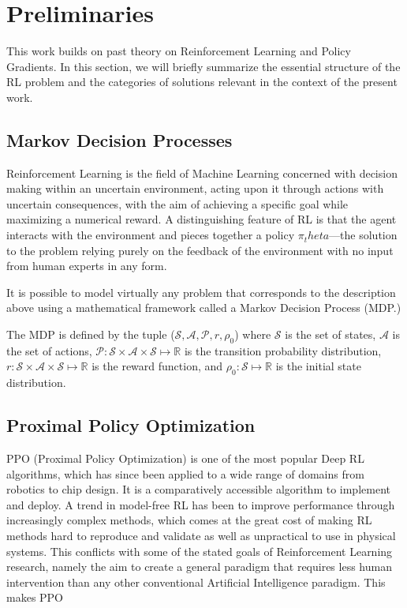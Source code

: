 \section{Preliminaries}
\label{sec:prelim}
This work builds on past theory on Reinforcement Learning and Policy Gradients. In this section, we will briefly summarize the essential structure of the RL problem and the categories of solutions relevant in the context of the present work.

\subsection{Markov Decision Processes}

Reinforcement Learning is the field of Machine Learning concerned with decision making within an uncertain environment, acting upon it through actions with uncertain consequences, with the aim of achieving a specific goal while maximizing a numerical reward. A distinguishing feature of RL is that the agent interacts with the environment and pieces together a policy $\pi_theta$––the solution to the problem relying purely on the feedback of the environment with no input from human experts in any form. 

It is possible to model virtually any problem that corresponds to the description above using a mathematical framework called a Markov Decision Process (MDP.) 

The MDP is defined by the tuple ($\mathcal{S}, \mathcal{A}, \mathcal{P}, r, \rho_0$) where $\mathcal{S}$ is the set of states, $\mathcal{A}$ is the set of actions, $\mathcal{P}: \mathcal{S}\times\mathcal{A}\times\mathcal{S}\mapsto \mathbb{R}$ is the transition probability distribution, $r: \mathcal{S}\times\mathcal{A}\times\mathcal{S} \mapsto \mathbb{R}$ is the reward function, and $\rho_0:\mathcal{S}\mapsto\mathbb{R}$ is the initial state distribution.


\subsection{Proximal Policy Optimization}

PPO (Proximal Policy Optimization\cite{schulman2017proximal}) is one of the most popular Deep RL algorithms, which has since been applied to a wide range of domains from robotics\cite{andrychowicz2020learning} to chip design\cite{mirhoseini2021graph}. It is a comparatively accessible algorithm to implement and deploy. A trend in model-free RL has been to improve performance through increasingly complex methods, which comes at the great cost of making RL methods hard to reproduce and validate as well as unpractical to use in physical systems. This conflicts with some of the stated goals of Reinforcement Learning research, namely the aim to create a general paradigm that requires less human intervention than any other conventional Artificial Intelligence paradigm. This makes PPO

